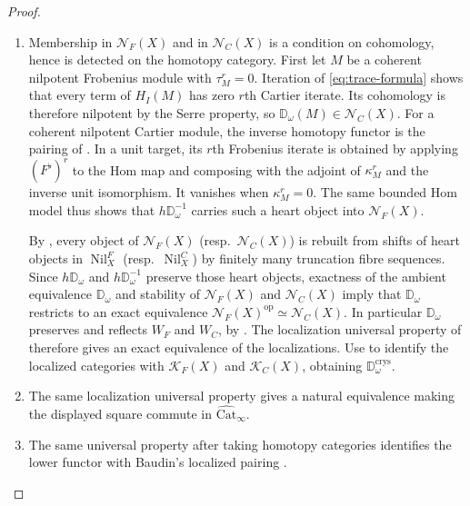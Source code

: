 \documentclass[11pt]{amsart}
\newcommand{\cN}{\mathcal{N}}
\newcommand{\op}{{\operatorname{op}}}
\newcommand{\Catbig}{\widehat{\mathrm{Cat}}}
\newcommand{\Nil}{\operatorname{Nil}}
\newcommand{\KF}{\mathcal K_F}
\newcommand{\KC}{\mathcal K_C}
\theoremstyle{plain}
\theoremstyle{definition}
\numberwithin{equation}{section}
\begin{document}
\begin{proof}
\begin{enumerate}
\item
Membership in $\cN_F(X)$ and in $\cN_C(X)$ is a condition on cohomology, hence is detected on the homotopy category.
First let $M$ be a coherent nilpotent Frobenius module with $\tau_M^{r}=0$.
Iteration of \eqref{eq:trace-formula} shows that every term of $H_I(M)$ has zero $r$th Cartier iterate.
Its cohomology is therefore nilpotent by the Serre property, so $\mathbb D_\omega(M)\in\cN_C(X)$.
For a coherent nilpotent Cartier module, the inverse homotopy functor is the pairing of \cite[Construction 4.1.4; Proposition 4.1.6]{Bau}.
In a unit target, its $r$th Frobenius iterate is obtained by applying $(F^\flat)^r$ to the Hom map and composing with the adjoint of $\kappa_M^{r}$ and the inverse unit isomorphism.
It vanishes when $\kappa_M^{r}=0$.
The same bounded Hom model thus shows that $h\mathbb D_\omega^{-1}$ carries such a heart object into $\cN_F(X)$.

By , every object of $\cN_F(X)$ (resp.\ $\cN_C(X)$) is rebuilt from shifts of heart objects in $\Nil^F_X$ (resp.\ $\Nil^C_X$) by finitely many truncation fibre sequences.
Since $h\mathbb D_\omega$ and $h\mathbb D_\omega^{-1}$ preserve those heart objects, exactness of the ambient equivalence $\mathbb D_\omega$ and stability of $\cN_F(X)$ and $\cN_C(X)$ imply that $\mathbb D_\omega$ restricts to an exact equivalence $\cN_F(X)^{\op}\simeq\cN_C(X)$.
In particular $\mathbb D_\omega$ preserves and reflects $W_F$ and $W_C$, by .
The localization universal property of \cite[Theorem I.3.3(i)]{NS} therefore gives an exact equivalence of the localizations.
Use  to identify the localized categories with $\KF(X)$ and $\KC(X)$, obtaining $\mathbb D^{\mathrm{crys}}_\omega$.
\item
The same localization universal property gives a natural equivalence making the displayed square commute in $\Catbig_\infty$.
\item
The same universal property after taking homotopy categories identifies the lower functor with Baudin's localized pairing \cite[Theorem 4.3.5]{Bau}.
\end{enumerate}
\end{proof}
\end{document}
